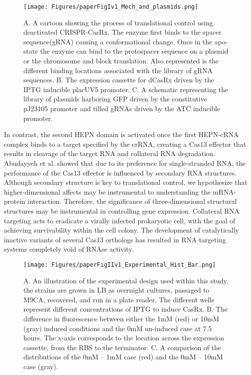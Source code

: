 \documentclass[times]{zHenriquesLab-StyleBioRxiv}
\begin{document}
\begin{figure*}[t] %
    \centering
    \texttt{[image: Figures/paperFigIv1\_Mech\_and\_plasmids.png]}
    
    \caption{
        \scriptsize A. A cartoon showing the process of translational control using deactivated CRISPR-CasRx. The enzyme first binds to the spacer sequence(gRNA) causing a conformational change. Once in the apo-state the enzyme can bind to the protospacer sequence on a plasmid or the chromosome and block translation. Also represented is the different binding locations associated with the library of gRNA sequences. B. The expression cassette for dCasRx driven by the IPTG inducible placUV5 promoter.  C. A schematic representing the library of plasmids harboring GFP driven by the constitutive pJ23105 promoter and tilled gRNAs driven by the ATC inducible promoter.}

    \label{fig:1}
\end{figure*}

In contrast, the second HEPN domain is activated once the first HEPN-cRNA complex binds to a target specified by the crRNA,  creating a Cas13 effector that results in cleavage of the target RNA and collateral RNA degradation\textsuperscript{\cite{East-Seletsky:2016aa}}. Abudayyeh et al. showed that due to its preference for single-stranded RNA, the performance of the Cas13 effector is influenced by secondary RNA structures\textsuperscript{\cite{Abudayyeh2016}}. Although secondary structure is key to translational control, we hypothesize that higher-dimensional affects may be instrumental to understanding the mRNA-protein interaction. Therefore, the significance of three-dimensional structural structures may be instrumental in controlling gene expression.\textsuperscript{\cite{Abudayyeh2016}} Collateral RNA targeting acts to eradicate a virally infected prokaryotic cell, with the goal of achieving survivability within the cell colony. The development of catalytically inactive variants of several Cas13 orthologs has resulted in RNA targeting systems completely void of RNAse activity\textsuperscript{\cite{Abudayyeh2016}}.

\begin{figure*}[t!]
    \centering  
    \texttt{[image: Figures/paperFigIIv1\_Experimental\_Hist\_Bar.png]}
    \label{fig:2}
    \caption{A. An illustration of the experimental design used within this study, the strains are grown in LB as overnight cultures, passaged to M9CA, recovered, and run in a plate reader. The different wells represent different concentrations of IPTG to induce CasRx. B. The difference in fluorescence between either the 1mM (red) or 10mM (gray) induced conditions and the 0mM un-induced case at 7.5 hours. The x-axis corresponds to the location across the expression cassette, from the RBS to the terminator. C. A comparison of the distributions of the 0mM – 1mM case (red) and the 0mM – 10mM case (gray).}
\end{figure*}
\end{document}
